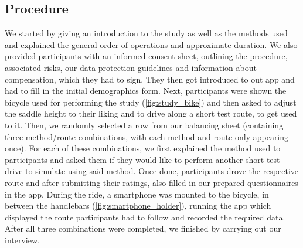 \subsection{Procedure}

We started by giving an introduction to the study as well as the methods used and explained the general order of operations and approximate duration.
We also provided participants with an informed consent sheet, outlining the procedure, associated risks, our data protection guidelines and information about compensation, which they had to sign.
They then got introduced to out \likertshift app and had to fill in the initial demographics form.
Next, participants were shown the bicycle used for performing the study (\autoref{fig:study_bike}) and then asked to adjust the saddle height to their liking and to drive along a short test route, to get used to it.
Then, we randomly selected a row from our balancing sheet (containing three method/route combinations, with each method and route only appearing once).
For each of these combinations, we first explained the method used to participants and asked them if they would like to perform another short test drive to simulate using said method.
Once done, participants drove the respective route and after submitting their ratings, also filled in our prepared questionnaires in the \likertshift app.
During the ride, a smartphone was mounted to the bicycle, in between the handlebars (\autoref{fig:smartphone_holder}), running the \likertshift app which displayed the route participants had to follow and recorded the required data.
After all three combinations were completed, we finished by carrying out our interview.

